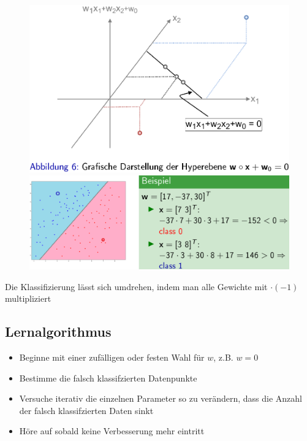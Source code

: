 \documentclass{report}
\begin{document}
\begin{figure}[H]
  \centering
  \begin{minipage}[b]{0.4\textwidth}
    \includegraphics[scale=.25]{ml04_4}
  \end{minipage}
  \hfill
  \begin{minipage}[b]{0.4\textwidth}
    \includegraphics[scale=.25]{ml04_5}
  \end{minipage}
\end{figure}

Die Klassifizierung lässt sich umdrehen, indem man alle Gewichte mit $\cdot (-1)$ multipliziert

\subsection{Lernalgorithmus}
\begin{itemize}
  \item Beginne mit einer zufälligen oder festen Wahl für $w$, z.B. $w = 0$
  \item Bestimme die falsch klassifzierten Datenpunkte
  \item Versuche iterativ die einzelnen Parameter so zu verändern, dass die Anzahl der falsch klassifzierten Daten sinkt
  \item Höre auf sobald keine Verbesserung mehr eintritt
\end{itemize}
\end{document}
